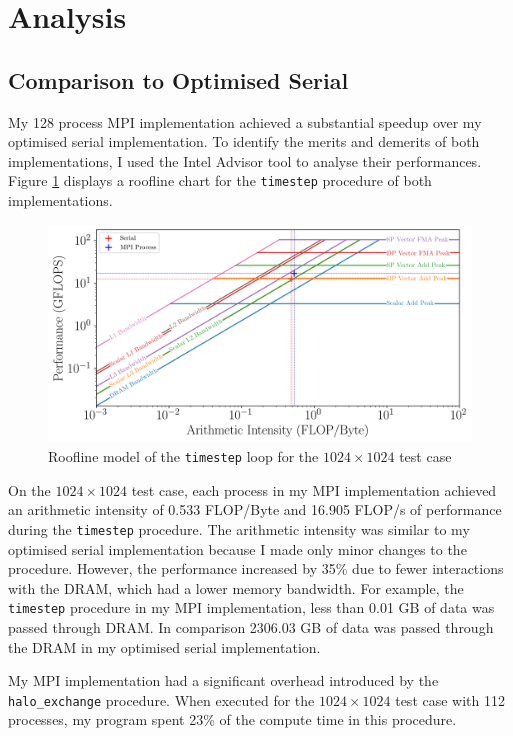\documentclass[twocolumn, a4paper]{article}
\begin{document}
\section{Analysis}

\subsection{Comparison to Optimised Serial}

My 128 process MPI implementation achieved a substantial speedup over my optimised serial implementation.
To identify the merits and demerits of both implementations, I used the Intel Advisor tool to analyse their performances.
Figure \ref{fig:roofline} displays a roofline chart for the \texttt{timestep} procedure of both implementations.

\begin{figure}[htbp]
  \centering
  \includegraphics[width=\linewidth]{roofline.png}
  \caption{Roofline model of the \texttt{timestep} loop for the $1024\times1024$ test case}\label{fig:roofline}
\end{figure}

On the $1024 \times 1024$ test case, each process in my MPI implementation achieved an arithmetic intensity of 0.533 FLOP/Byte and 16.905 FLOP/s of performance during the \texttt{timestep} procedure.
The arithmetic intensity was similar to my optimised serial implementation because I made only minor changes to the procedure.
However, the performance increased by 35\% due to fewer interactions with the DRAM, which had a lower memory bandwidth.
For example, the \texttt{timestep} procedure in my MPI implementation, less than 0.01 GB of data was passed through DRAM.
In comparison 2306.03 GB of data was passed through the DRAM in my optimised serial implementation.

My MPI implementation had a significant overhead introduced by the \texttt{halo\_exchange} procedure.
When executed for the $1024\times1024$ test case with 112 processes, my program spent 23\% of the compute time in this procedure.
\end{document}
